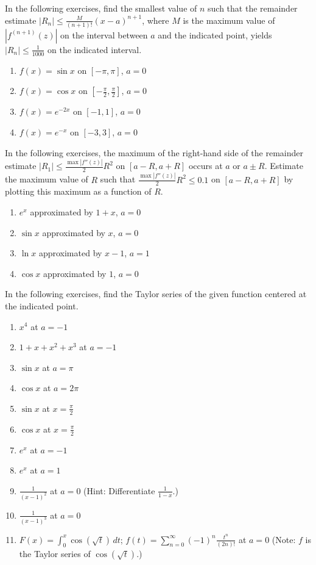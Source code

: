 \documentclass{exercises}
\begin{document}
In the following exercises, find the smallest value of $n$ such that the remainder estimate $|R_{n}|\le \frac{M}{(n+1)!}(x-a)^{n+1}$, where $M$ is the maximum value of $|f^{(n+1)}(z)|$ on the interval between $a$ and the indicated point, yields $|R_{n}|\le \frac{1}{1000}$ on the indicated interval.

\begin{enumerate}[resume]
\item $f(x)=\sin x$ on $[-\pi,\pi]$, $a=0$
\item $f(x)=\cos x$ on $[-\frac{\pi}{2},\frac{\pi}{2}]$, $a=0$
\item $f(x)=e^{-2x}$ on $[-1,1]$, $a=0$
\item $f(x)=e^{-x}$ on $[-3,3]$, $a=0$
\end{enumerate}

In the following exercises, the maximum of the right-hand side of the remainder estimate $|R_{1}|\le \frac{\max |f''(z)|}{2}R^{2}$ on $[a-R,a+R]$ occurs at $a$ or $a\pm R$. Estimate the maximum value of $R$ such that $\frac{\max |f''(z)|}{2}R^{2}\le 0.1$ on $[a-R,a+R]$ by plotting this maximum as a function of $R$.

\begin{enumerate}[resume]
\item \techrequired $e^{x}$ approximated by $1+x$, $a=0$
\item \techrequired $\sin x$ approximated by $x$, $a=0$
\item \techrequired $\ln x$ approximated by $x-1$, $a=1$
\item \techrequired $\cos x$ approximated by $1$, $a=0$
\end{enumerate}

In the following exercises, find the Taylor series of the given function centered at the indicated point.

\begin{enumerate}[resume]
\item $x^{4}$ at $a=-1$
\item $1+x+x^{2}+x^{3}$ at $a=-1$
\item $\sin x$ at $a=\pi$
\item $\cos x$ at $a=2\pi$
\item $\sin x$ at $x=\frac{\pi}{2}$
\item $\cos x$ at $x=\frac{\pi}{2}$
\item $e^{x}$ at $a=-1$
\item $e^{x}$ at $a=1$
\item $\frac{1}{(x-1)^{2}}$ at $a=0$ (Hint: Differentiate $\frac{1}{1-x}$.)
\item $\frac{1}{(x-1)^{3}}$ at $a=0$
\item $F(x)=\int_{0}^{x}\cos(\sqrt{t})\,dt$; $f(t)=\sum_{n=0}^{\infty}(-1)^{n}\frac{t^{n}}{(2n)!}$ at $a=0$ (Note: $f$ is the Taylor series of $\cos(\sqrt{t})$.)
\end{enumerate}
\end{document}
